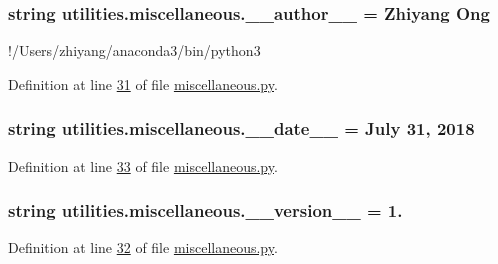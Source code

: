 \subsubsection[{\+\_\+\+\_\+author\+\_\+\+\_\+}]{\setlength{\rightskip}{0pt plus 5cm}string utilities.\+miscellaneous.\+\_\+\+\_\+author\+\_\+\+\_\+ = \textquotesingle{}Zhiyang Ong\textquotesingle{}}\label{namespaceutilities_1_1miscellaneous_a48adfde4ebd796df397b62ffacb0e3e3}


!/\+Users/zhiyang/anaconda3/bin/python3 



Definition at line \hyperlink{miscellaneous_8py_source_l00031}{31} of file \hyperlink{miscellaneous_8py_source}{miscellaneous.\+py}.

\hypertarget{namespaceutilities_1_1miscellaneous_aa0bfe4910c50f1be3cd69ebad7060965}{}
\subsubsection[{\+\_\+\+\_\+date\+\_\+\+\_\+}]{\setlength{\rightskip}{0pt plus 5cm}string utilities.\+miscellaneous.\+\_\+\+\_\+date\+\_\+\+\_\+ = \textquotesingle{}July 31, 2018\textquotesingle{}}\label{namespaceutilities_1_1miscellaneous_aa0bfe4910c50f1be3cd69ebad7060965}


Definition at line \hyperlink{miscellaneous_8py_source_l00033}{33} of file \hyperlink{miscellaneous_8py_source}{miscellaneous.\+py}.

\hypertarget{namespaceutilities_1_1miscellaneous_a05f25f703eec056b7c3387b0d5ee06c5}{}
\subsubsection[{\+\_\+\+\_\+version\+\_\+\+\_\+}]{\setlength{\rightskip}{0pt plus 5cm}string utilities.\+miscellaneous.\+\_\+\+\_\+version\+\_\+\+\_\+ = \textquotesingle{}1.\textquotesingle{}}\label{namespaceutilities_1_1miscellaneous_a05f25f703eec056b7c3387b0d5ee06c5}


Definition at line \hyperlink{miscellaneous_8py_source_l00032}{32} of file \hyperlink{miscellaneous_8py_source}{miscellaneous.\+py}.

